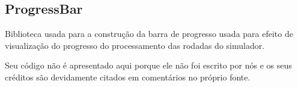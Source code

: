 \subsection{ProgressBar}
Biblioteca usada para a construção da barra de progresso usada para efeito de visualização do progresso do processamento das rodadas do simulador.

Seu código não é apresentado aqui porque ele não foi escrito por nós e os seus créditos são devidamente citados em comentários no próprio fonte.

